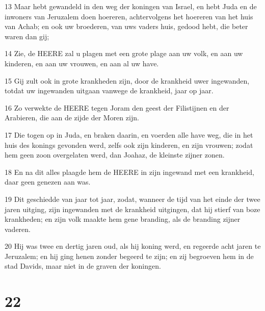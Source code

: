 \par 13 Maar hebt gewandeld in den weg der koningen van Israel, en hebt Juda en de inwoners van Jeruzalem doen hoereren, achtervolgens het hoereren van het huis van Achab; en ook uw broederen, van uws vaders huis, gedood hebt, die beter waren dan gij;
\par 14 Zie, de HEERE zal u plagen met een grote plage aan uw volk, en aan uw kinderen, en aan uw vrouwen, en aan al uw have.
\par 15 Gij zult ook in grote krankheden zijn, door de krankheid uwer ingewanden, totdat uw ingewanden uitgaan vanwege de krankheid, jaar op jaar.
\par 16 Zo verwekte de HEERE tegen Joram den geest der Filistijnen en der Arabieren, die aan de zijde der Moren zijn.
\par 17 Die togen op in Juda, en braken daarin, en voerden alle have weg, die in het huis des konings gevonden werd, zelfs ook zijn kinderen, en zijn vrouwen; zodat hem geen zoon overgelaten werd, dan Joahaz, de kleinste zijner zonen.
\par 18 En na dit alles plaagde hem de HEERE in zijn ingewand met een krankheid, daar geen genezen aan was.
\par 19 Dit geschiedde van jaar tot jaar, zodat, wanneer de tijd van het einde der twee jaren uitging, zijn ingewanden met de krankheid uitgingen, dat hij stierf van boze krankheden; en zijn volk maakte hem gene branding, als de branding zijner vaderen.
\par 20 Hij was twee en dertig jaren oud, als hij koning werd, en regeerde acht jaren te Jeruzalem; en hij ging henen zonder begeerd te zijn; en zij begroeven hem in de stad Davids, maar niet in de graven der koningen.

\chapter{22}

